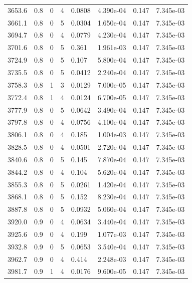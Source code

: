 \documentclass[preview]{standalone}
\begin{document}
{{{{{{{{{\begin{tabular}{L{1.2cm}C{1.2cm} C{0.3cm}C{0.5cm} C{1.4cm}C{1.4cm} C{1.4cm}C{1.4cm}}
  3653.6  &   0.8  & 0     &  4 &  0.0808  & 4.390e-04  & 0.147 &  7.345e-03   \\ 
  3661.1  &   0.8  & 0     &  5 &  0.0304  & 1.650e-04  & 0.147 &  7.345e-03   \\ 
  3694.7  &   0.8  & 0     &  4 &  0.0779  & 4.230e-04  & 0.147 &  7.345e-03   \\ 
  3701.6  &   0.8  & 0     &  5 &  0.361  & 1.961e-03  & 0.147 &  7.345e-03   \\ 
  3724.9  &   0.8  & 0     &  5 &  0.107  & 5.800e-04  & 0.147 &  7.345e-03   \\ 
  3735.5  &   0.8  & 0     &  5 &  0.0412  & 2.240e-04  & 0.147 &  7.345e-03   \\ 
  3758.3  &   0.8  & 1     &  3 &  0.0129  & 7.000e-05  & 0.147 &  7.345e-03   \\ 
  3772.4  &   0.8  & 1     &  4 &  0.0124  & 6.700e-05  & 0.147 &  7.345e-03   \\ 
  3777.9  &   0.8  & 0     &  5 &  0.0642  & 3.490e-04  & 0.147 &  7.345e-03   \\ 
  3797.8  &   0.8  & 0     &  4 &  0.0756  & 4.100e-04  & 0.147 &  7.345e-03   \\ 
  3806.1  &   0.8  & 0     &  4 &  0.185  & 1.004e-03  & 0.147 &  7.345e-03   \\ 
  3828.5  &   0.8  & 0     &  4 &  0.0501  & 2.720e-04  & 0.147 &  7.345e-03   \\ 
  3840.6  &   0.8  & 0     &  5 &  0.145  & 7.870e-04  & 0.147 &  7.345e-03   \\ 
  3844.2  &   0.8  & 0     &  4 &  0.104  & 5.620e-04  & 0.147 &  7.345e-03   \\ 
  3855.3  &   0.8  & 0     &  5 &  0.0261  & 1.420e-04  & 0.147 &  7.345e-03   \\ 
  3868.1  &   0.8  & 0     &  5 &  0.152  & 8.230e-04  & 0.147 &  7.345e-03   \\ 
  3887.8  &   0.8  & 0     &  5 &  0.0932  & 5.060e-04  & 0.147 &  7.345e-03   \\ 
  3920.0  &   0.9  & 0     &  4 &  0.0634  & 3.440e-04  & 0.147 &  7.345e-03   \\ 
  3925.6  &   0.9  & 0     &  4 &  0.199  & 1.077e-03  & 0.147 &  7.345e-03   \\ 
  3932.8  &   0.9  & 0     &  5 &  0.0653  & 3.540e-04  & 0.147 &  7.345e-03   \\ 
  3962.7  &   0.9  & 0     &  4 &  0.414  & 2.248e-03  & 0.147 &  7.345e-03   \\ 
  3981.7  &   0.9  & 1     &  4 &  0.0176  & 9.600e-05  & 0.147 &  7.345e-03   \\ 

\end{tabular}}}}}}}}}}
\end{document}
